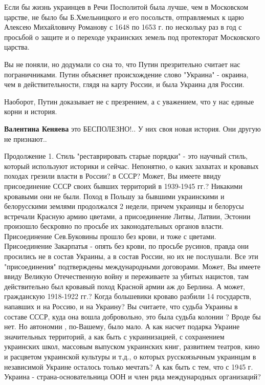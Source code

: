 \begin{itemize}
Если бы жизнь украинцев в Речи Посполитой была лучше, чем в Московском царстве,
не было бы Б.Хмельницкого и его посольств, отправляемых к царю Алексею
Михайловичу Романову с 1648 по 1653 г.  по нескольку раз в год с просьбой о
защите и о переходе украинских земель под протекторат Московского царства. 

Вы не поняли, но додумали со сна то, что Путин презрительно считает нас
пограничниками. Путин объясняет происхождение слово "Украина" - окраина, чем в
действительности, глядя на карту России, и была Украина для России. 

Наоборот, Путин доказывает не с презрением, а с уважением, что у нас единые
корни и история.

\begin{itemize}
 
\textbf{Валентина Кеняева} это БЕСПОЛЕЗНО!.. У них своя новая история. Они другую не признают..
\end{itemize}

 

Продолжение 1. Стиль "реставрировать старые порядки" - это научный стиль,
который используют историки и сейчас. Непонятно, о каких захватах и кровавых
походах грезили власти в России? в СССР? Может, Вы имеете ввиду присоединение
СССР своих бывших территорий в 1939-1945 гг.? Никакими кровавыми они не были.
Поход в Польшу за бывшими украинскими и белорусскими землями продолжался 2
недели, причем украинцы и белорусы встречали Красную армию цветами, а
присоединение Литвы, Латвии, Эстонии произошло бескровно по просьбе их
законодательных органов власти. Присоединение Сев.Буковины прошло без крови, и
тоже с цветами. Присоединение Закарпатья - опять без крови, по просьбе русинов,
правда они просились не в состав Украины, а в состав России, но их не
послушали. Все эти "присоединения" подтверждены международными договорами.
Может, Вы имеете ввиду Великую Отечественную войну и переживаете за убитых
нацистов, там действительно был кровавый поход Красной армии аж до Берлина. А
может, гражданскую 1918-1922 гг.? Когда большевики кроваво разбили 14
государств, напавших и на Россию, и на Украину? Вы считаете, что судьба Украины
в составе СССР, куда она вошла добровольно, это была судьба колонии ? Вроде бы
нет. Но автономии , по-Вашему, было мало. А как насчет подарка Украине
значительных территорий, а как быть с украинизацией, с сохранением украинских
школ, массовым выпуском украинских книг, развитием театров, кино и расцветом
украинской культуры и т.д., о которых русскоязычным украинцам в независимой
Украине осталось только мечтать? А как быть с тем, что с 1945 г. Украина -
страна-основательница ООН и член ряда международных организаций?


\end{itemize}
